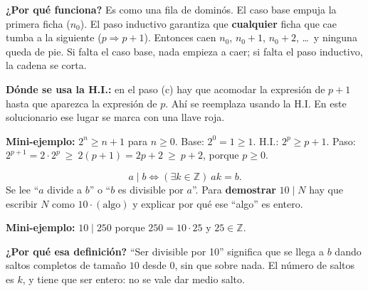 \documentclass[11pt]{article}
\begin{document}
\textbf{¿Por qué funciona?} Es como una fila de dominós. El caso base empuja la primera ficha ($n_0$). El paso inductivo garantiza que \textbf{cualquier} ficha que cae tumba a la siguiente ($p\Rightarrow p+1$). Entonces caen $n_0$, $n_0+1$, $n_0+2$, \dots\ y ninguna queda de pie. Si falta el caso base, nada empieza a caer; si falta el paso inductivo, la cadena se corta.

\textbf{Dónde se usa la H.I.:} en el paso (c) hay que acomodar la expresión de $p+1$ hasta que aparezca la expresión de $p$. Ahí se reemplaza usando la H.I. En este solucionario ese lugar se marca con una llave roja.

\textbf{Mini-ejemplo:} $2^n\ge n+1$ para $n\ge 0$. Base: $2^0=1\ge 1$. H.I.: $2^p\ge p+1$. Paso: $2^{p+1}=2\cdot 2^p\ \ge\ 2(p+1)=2p+2\ \ge\ p+2$, porque $p\ge 0$.

\bigskip
\begin{minipage}[t]{0.56\textwidth}
\[
a\mid b \iff (\exists k\in\mathbb Z)\ ak=b .
\]
Se lee ``$a$ divide a $b$'' o ``$b$ es divisible por $a$''. Para \textbf{demostrar} $10\mid N$ hay que escribir $N$ como $10\cdot(\text{algo})$ y explicar por qué ese ``algo'' es entero.

\textbf{Mini-ejemplo:} $10\mid 250$ porque $250=10\cdot 25$ y $25\in\mathbb Z$.
\end{minipage}\hfill
\begin{minipage}[t]{0.40\textwidth}
\vspace{0.4em}
\begin{center}
\end{center}
\end{minipage}

\textbf{¿Por qué esa definición?} ``Ser divisible por 10'' significa que se llega a $b$ dando saltos completos de tamaño $10$ desde $0$, sin que sobre nada. El número de saltos es $k$, y tiene que ser entero: no se vale dar medio salto.
\end{document}
